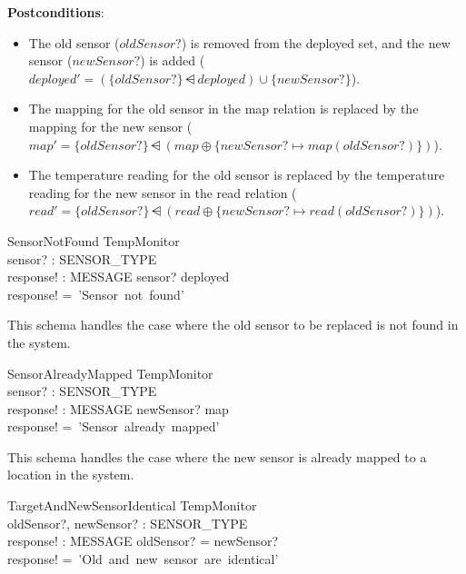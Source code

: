 \documentclass[12pt]{article}
\begin{document}
\begin{spacing}{1.5}
    \textbf{Postconditions}:
    \begin{itemize}
        \item The old sensor ($oldSensor?$) is removed from the deployed set, and the new sensor ($newSensor?$) is added ($deployed' = (\{oldSensor?\} \dsub deployed) \cup \{newSensor?\}$).
        \item The mapping for the old sensor in the map relation is replaced by the mapping for the new sensor ($map' = \{oldSensor?\} \dsub (map \oplus \{newSensor? \mapsto map(oldSensor?)\})$).
        \item The temperature reading for the old sensor is replaced by the temperature reading for the new sensor in the read relation ($read' = \{oldSensor?\} \dsub (read \oplus \{newSensor? \mapsto read(oldSensor?)\})$).
    \end{itemize}

    \begin{schema}{SensorNotFound}
        \Xi TempMonitor \\
        sensor? : SENSOR\_TYPE \\
        response! : MESSAGE
        \where
        sensor? \notin deployed \\
        response! =~'Sensor~not~found'
    \end{schema}

    This schema handles the case where the old sensor to be replaced is not found in the system.

    \begin{schema}{SensorAlreadyMapped}
        \Xi TempMonitor \\
        sensor? : SENSOR\_TYPE \\
        response! : MESSAGE
        \where
        newSensor? \in \dom map \\
        response! =~'Sensor~already~mapped'
    \end{schema}

    This schema handles the case where the new sensor is already mapped to a location in the system.
    
    \begin{schema}{TargetAndNewSensorIdentical}
        \Xi TempMonitor \\
        oldSensor?, newSensor? : SENSOR\_TYPE \\
        response! : MESSAGE
        \where
        oldSensor? = newSensor? \\
        response! =~'Old~and~new~sensor~are~identical'
    \end{schema}


\end{spacing}
\end{document}
